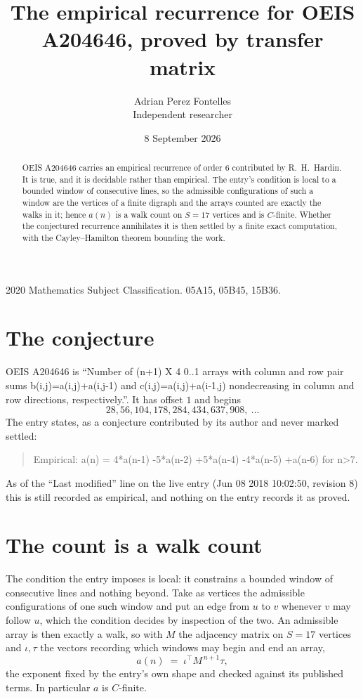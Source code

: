 \documentclass[11pt,a4paper]{article}
\title{The empirical recurrence for OEIS A204646, proved by transfer matrix}
\author{Adrian Perez Fontelles\\ \small Independent researcher}
\date{8 September 2026}
\theoremstyle{plain}
\theoremstyle{definition}
\begin{document}
\maketitle

\begin{abstract}
OEIS A204646 carries an empirical recurrence of order $6$ contributed by R.~H.~Hardin. It is
true, and it is decidable rather than empirical. The entry's condition is local to a bounded window of consecutive lines, so
the admissible configurations of such a window are the vertices of a finite digraph and the
arrays counted are exactly the walks in it; hence $a(n)$ is a walk count on $S=17$ vertices
and is $C$-finite. Whether the conjectured recurrence annihilates it is then settled by a
finite exact computation, with the Cayley--Hamilton theorem bounding the work.
\end{abstract}

\noindent\small 2020 Mathematics Subject Classification. 05A15, 05B45, 15B36.\normalsize

\section{The conjecture}

OEIS A204646 is ``Number of (n+1) X 4 0..1 arrays with column and row pair sums b(i,j)=a(i,j)+a(i,j-1) and c(i,j)=a(i,j)+a(i-1,j) nondecreasing in column and row directions, respectively.''. It has offset $1$ and begins
\[
28, 56, 104, 178, 284, 434, 637, 908,\ \dots
\]
The entry states, as a conjecture contributed by its author and never marked settled:
\begin{quote}
Empirical: a(n) = 4*a(n-1) -5*a(n-2) +5*a(n-4) -4*a(n-5) +a(n-6) for n>7.
\end{quote}
As of the ``Last modified'' line on the live entry (Jun 08 2018 10:02:50, revision 8) this is still
recorded as empirical, and nothing on the entry records it as proved.

\section{The count is a walk count}

The condition the entry imposes is local: it constrains a bounded window of consecutive lines and nothing beyond. Take as
vertices the admissible configurations of one such window and put an edge from $u$ to $v$
whenever $v$ may follow $u$, which the condition decides by inspection of the two. An
admissible array is then exactly a walk, so with $M$ the adjacency matrix on $S=17$ vertices
and $\iota,\tau$ the vectors recording which windows may begin and end an array,
\[
a(n)\;=\;\iota^{\!\top}M^{\,n+1}\tau ,
\]
the exponent fixed by the entry's own shape and checked against its published terms. In
particular $a$ is $C$-finite.
\end{document}
